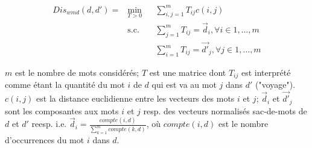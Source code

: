 \begin{itemize}
	\begin{equation*}
	\begin{aligned}
Dis_{wmd}(d, d') = 	& \min\limits_{T>0}
	& & \sum\limits_{i,j=1}^m T_{ij} c(i,j) \\
	& \text{s.c.}
	& & \sum\limits_{j=1}^m T_{ij} = \vec{d}_i, \forall i \in {1, \dots, m} \\
	& 
	& & \sum\limits_{i=1}^m T_{ij} = \vec{d'}_j, \forall j \in {1, \dots, m}	
	\end{aligned}
	\end{equation*} 
	
	$m$ est le nombre de mots considérés; $T$ est une matrice dont $T_{ij}$ est interprété comme étant la quantité du mot $i$ de $d$ qui est va au mot $j$ dans $d'$ ("voyage"). $c(i,j)$ est la distance euclidienne entre les vecteurs des mots $i$ et $j$; $\vec{d}_i$ et $\vec{d'}_j$ sont les composantes aux mots $i$ et $j$ resp. des vecteurs normalisés sac-de-mots de $d$ et $d'$ reesp. i.e. $\vec{d}_i = \frac{compte(i, d)}{\sum\limits_{k=1}^m compte(k, d)}$, où $compte(i, d)$ est le nombre d'occurrences du mot $i$ dans $d$.
	
\end{itemize}


 
